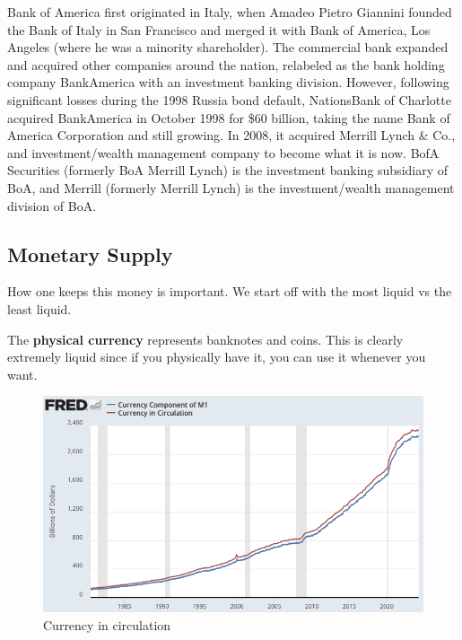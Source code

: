 \documentclass{article}
\begin{document}
      \begin{example}
        Bank of America first originated in Italy, when Amadeo Pietro Giannini founded the Bank of Italy in San Francisco and merged it with Bank of America, Los Angeles (where he was a minority shareholder). The commercial bank expanded and acquired other companies around the nation, relabeled as the bank holding company BankAmerica with an investment banking division. However, following significant losses during the 1998 Russia bond default, NationsBank of Charlotte acquired BankAmerica in October 1998 for \$60 billion, taking the name Bank of America Corporation and still growing. In 2008, it acquired Merrill Lynch \& Co., and investment/wealth management company to become what it is now. BofA Securities (formerly BoA Merrill Lynch) is the investment banking subsidiary of BoA, and Merrill (formerly Merrill Lynch) is the investment/wealth management division of BoA. 
      \end{example}

  \subsection{Monetary Supply}

    How one keeps this money is important. We start off with the most liquid vs the least liquid. 

    \begin{definition}
      The \textbf{physical currency} represents banknotes and coins. This is clearly extremely liquid since if you physically have it, you can use it whenever you want. 
      \begin{figure}[H]
        \centering 
        \includegraphics[scale=0.4]{img/currency_circulation.png}
        \caption{Currency in circulation} 
        \label{fig:circulation}
      \end{figure}
    \end{definition}
\end{document}
